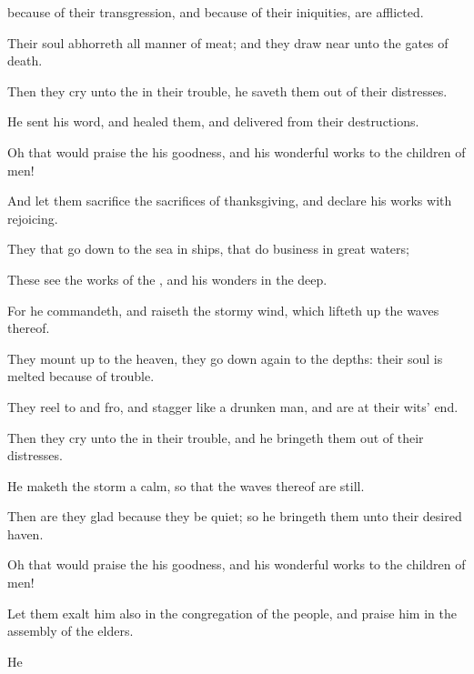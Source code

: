 {because of their
transgression, and because of their
iniquities, are
afflicted.
\par }{\Q {}Their
soul
abhorreth all manner of
meat; and they draw
near unto the
gates of
death.
\par }{\Q {}Then they
cry unto the
{} in their
trouble,
{} he
saveth them out of their
distresses.
\par }{\Q {}He
sent his
word, and
healed them, and
delivered
{} from their
destructions.
\par }{\Q {}Oh that
{} would
praise the
{}
{} his
goodness, and
{} his wonderful
works to the
children of
men!
\par }{\Q {}And let them
sacrifice the
sacrifices of
thanksgiving, and
declare his
works with
rejoicing.
\par }{\BB \par }{\Q {}They that go
down to the
sea in
ships, that
do
business in
great
waters;
\par }{\Q {}These
see the
works of the
{}, and his
wonders in the
deep.
\par }{\Q {}For he
commandeth, and
raiseth the
stormy
wind, which lifteth
up the
waves thereof.
\par }{\Q {}They mount
up to the
heaven, they go
down again to the
depths: their
soul is
melted because of
trouble.
\par }{\Q {}They reel to and
fro, and
stagger like a drunken
man, and are at their
wits’
end.
\par }{\Q {}Then they
cry unto the
{} in their
trouble, and he bringeth them
out of their
distresses.
\par }{\Q {}He
maketh the
storm a
calm, so that the
waves thereof are
still.
\par }{\Q {}Then are they
glad because they be
quiet; so he
bringeth them unto their
desired
haven.
\par }{\Q {}Oh that
{} would
praise the
{}
{} his
goodness, and
{} his wonderful
works to the
children of
men!
\par }{\Q {}Let them
exalt him also in the
congregation of the
people, and
praise him in the
assembly of the
elders.
\par }{\BB \par }{\Q {}He
}

